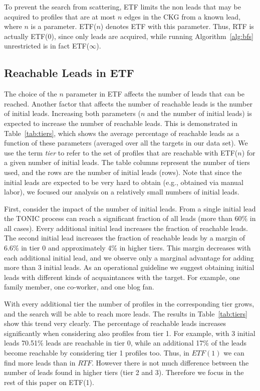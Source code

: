 \documentclass[journal]{IEEEtran}
\begin{document}
To prevent the search from scattering, ETF limits the non leads that may be acquired to profiles that are at most $n$ edges in the CKG from a known lead, where $n$ is a parameter. ETF($n$) denotes ETF with this parameter. Thus, RTF is actually ETF(0), since only leads are acquired, while running Algorithm~\ref{alg:bfs} unrestricted is in fact ETF($\infty$). 

\subsection{Reachable Leads in ETF}
The choice of the $n$ parameter in ETF affects the number of leads that can be reached. Another factor that affects the number of reachable leads is the number of initial leads. 
Increasing both parameters ($n$ and the number of initial leads) is expected to increase the number of reachable leads. This is demonstrated in Table~\ref{tab:tiers}, which shows the average percentage of reachable leads as a function of these parameters (averaged over all the targets in our data set). We use the term {\em tier} to refer to the set of profiles that are reachable with ETF($n$) for a given number of initial leads.
The table columns represent the number of tiers used, and the rows are the number of initial leads (rows). Note that since the initial leads are expected to be very hard to obtain (e.g., obtained via manual labor), we focused our analysis on a relatively small numbers of initial leads.


First, consider the impact of the number of initial leads. 
From a single initial lead the TONIC process can reach a significant fraction of all leads (more than 60\% in all cases). 
Every additional initial lead increases the fraction of reachable leads. 
The second initial lead increases the fraction of reachable leads by a margin of 6.6\% in tier 0 and approximately 4\% in higher tiers. 
This margin decreases with each additional initial lead, and we observe only a marginal advantage for adding more than 3 initial leads. 
As an operational guideline we suggest obtaining initial leads with different kinds of acquaintances with the target. For example, one family member, one co-worker, and one blog fan. 


With every additional tier the number of profiles in the corresponding tier grows, and the search will be able to reach more leads. The results in Table~\ref{tab:tiers} show this trend very clearly. The percentage of reachable leads increases significantly when considering also profiles from tier 1. For example, with 3 initial leads 70.51\% leads are reachable in tier 0, while an additional 17\% of the leads become reachable by considering tier 1 profiles too. Thus, in \(ETF(1)\) we can find more leads than in \(RTF\). However there is not much difference between the number of leads found in higher tiers (tier 2 and 3). Therefore we focus in the rest of this paper on ETF(1). 
\end{document}
